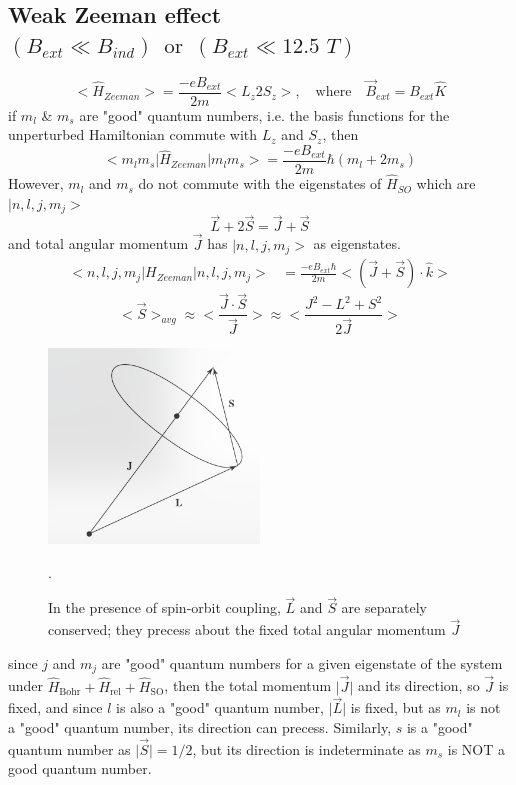 \documentclass[12pt,fancychapters]{report}
\numberwithin{equation}{section}
\begin{document}
\subsection{Weak Zeeman effect $(B_{ext}\ll B_{ind})\,\,\,\text{or}\,\,\,(B_{ext}\ll 12.5\,\,T)$}
\[
  \big<\hat{H}_{Zeeman}\big> = \frac{-eB_{ext}}{2m}\big<L_z 2S_z \big>,\quad \text{where}\quad
  \vec{B}_{ext} = B_{ext}\hat{K}
\]
if $m_l$ \& $m_s$ are "good" quantum numbers, i.e. the basis functions for the unperturbed 
Hamiltonian commute with $L_z$ and $S_z$, then
\[
  \big<m_l m_s\big|\hat{H}_{Zeeman}\big|m_lm_s\big> = \frac{-eB_{ext}}{2m} \hbar\left(
  m_l + 2m_s\right)
\]
However, $m_l$ and $m_s$ do not commute with the eigenstates of $\hat{H}_{SO}$ which are 
$\big|n, l, j, m_j\big>$
\[
  \vec{L}+2\vec{S} = \vec{J}+\vec{S}
\]
and total angular momentum $\vec{J}$ has $\big|n, l, j, m_j\big>$ as eigenstates.
\begin{align*}
  \big<n,l, j, m_j\big|H_{Zeeman}\big|n,l,j,m_j\big> &= \frac{-eB_{ext}\hbar}{2m}
  \big<(\vec{J}+\vec{S})\cdot\hat{k} \big>
\end{align*}
\[
  \big<\vec{S}\big>_{avg} \approx \bigg<\frac{\vec{J}\cdot\vec{S}}{\vec{J}} \bigg>
  \approx \bigg<\frac{J^2 - L^2 + S^2}{2\vec{J}}\bigg>
\]
\begin{figure}[H]
  \centering
  \includegraphics[width=0.5\textwidth]{../Figures/L17_1.png}
  \caption{In the presence of spin-orbit coupling, $\vec{L}$ and $\vec{S}$ are separately 
  conserved; they precess about the fixed total angular momentum $\vec{J}$}.
\end{figure}
since $j$ and $m_j$ are "good" quantum numbers for a given eigenstate of 
the system under $\hat{H}_\text{Bohr} + \hat{H}_\text{rel} + \hat{H}_\text{SO}$, then the total 
momentum $\big|\vec{J}\big|$ and its direction, so $\vec{J}$ is fixed, and since $l$ is also 
a "good" quantum number, $\big|\vec{L}\big|$ is fixed, but as $m_l$ is not a "good" quantum number,
its direction can precess. Similarly, $s$ is a "good" quantum number as $\big|\vec{S}\big| = 1/2$,
but its direction is indeterminate as $m_s$ is NOT a good quantum number.\\
\end{document}
